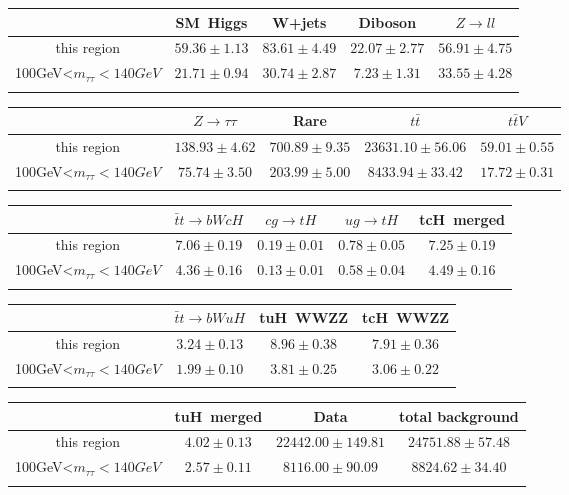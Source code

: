 \centering
\begin{tabular}{ccccc} \toprule\toprule
 & SM~Higgs & W+jets & Diboson & $Z\to ll$\\\midrule
this region & $59.36\pm1.13$ & $83.61\pm4.49$ & $22.07\pm2.77$ & $56.91\pm4.75$\\
100GeV<$m_{\tau\tau}<140GeV$ & $21.71\pm0.94$ & $30.74\pm2.87$ & $7.23\pm1.31$ & $33.55\pm4.28$\\
\bottomrule\bottomrule\\
\end{tabular}
\begin{tabular}{ccccc} \toprule\toprule
 & $Z\to \tau\tau$ & Rare & $t\bar{t}$ & $t\bar{t}V$\\\midrule
this region & $138.93\pm4.62$ & $700.89\pm9.35$ & $23631.10\pm56.06$ & $59.01\pm0.55$\\
100GeV<$m_{\tau\tau}<140GeV$ & $75.74\pm3.50$ & $203.99\pm5.00$ & $8433.94\pm33.42$ & $17.72\pm0.31$\\
\bottomrule\bottomrule\\
\end{tabular}
\begin{tabular}{ccccc} \toprule\toprule
 & $\bar{t}t\to bWcH$ & $cg\to tH$ & $ug\to tH$ & tcH~merged\\\midrule
this region & $7.06\pm0.19$ & $0.19\pm0.01$ & $0.78\pm0.05$ & $7.25\pm0.19$\\
100GeV<$m_{\tau\tau}<140GeV$ & $4.36\pm0.16$ & $0.13\pm0.01$ & $0.58\pm0.04$ & $4.49\pm0.16$\\
\bottomrule\bottomrule\\
\end{tabular}
\begin{tabular}{cccc} \toprule\toprule
 & $\bar{t}t\to bWuH$ & tuH~WWZZ & tcH~WWZZ\\\midrule
this region & $3.24\pm0.13$ & $8.96\pm0.38$ & $7.91\pm0.36$\\
100GeV<$m_{\tau\tau}<140GeV$ & $1.99\pm0.10$ & $3.81\pm0.25$ & $3.06\pm0.22$\\
\bottomrule\bottomrule\\
\end{tabular}
\begin{tabular}{cccc} \toprule\toprule
 & tuH~merged & Data & total background\\\midrule
this region & $4.02\pm0.13$ & $22442.00\pm149.81$ & $24751.88\pm57.48$\\
100GeV<$m_{\tau\tau}<140GeV$ & $2.57\pm0.11$ & $8116.00\pm90.09$ & $8824.62\pm34.40$\\
\bottomrule\bottomrule\\
\end{tabular}
